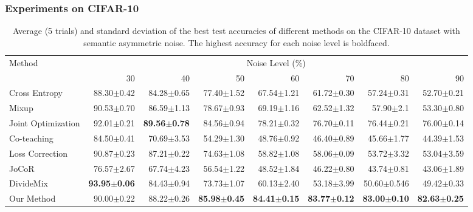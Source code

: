 \documentclass[conference]{IEEEtran}
\begin{document}
\subsubsection{Experiments on CIFAR-10}
\begin{table*}[!tb]
\caption{Average (5 trials) and standard deviation of the best test accuracies  of different methods on the CIFAR-10 dataset with semantic asymmetric noise. The highest accuracy for each noise level is boldfaced.}
\label{cifar_asyn}
\centering
\begin{tabular}{lrrrrrrr}
\toprule
\multirow{2}{*}{Method} & \multicolumn{7}{c}{Noise Level (\%)} \\ \cmidrule{2-8} 
  & 30  & 40  & 50  & 60  & 70  & 80  & 90  \\ \midrule
Cross Entropy   & 88.30$\pm$0.42 & 84.28$\pm$0.65 & 77.40$\pm$1.52 & 67.54$\pm$1.21 & 61.72$\pm$0.30 & 57.24$\pm$0.31 & 52.70$\pm$0.21   \\ \midrule
Mixup\cite{zhang2017mixup}  & 90.53$\pm$0.70 & 86.59$\pm$1.13 & 78.67$\pm$0.93 & 69.19$\pm$1.16 & 62.52$\pm$1.32 & 57.90$\pm$2.1 & 53.30$\pm$0.80    \\ \midrule
Joint Optimization\cite{tanaka2018joint}  & 92.01$\pm$0.21 & \textbf{89.56$\pm$0.78} & 84.56$\pm$0.94 & 78.21$\pm$0.32 & 76.70$\pm$0.11 & 76.44$\pm$0.21 & 76.00$\pm$0.14  \\ \midrule
Co-teaching\cite{han2018co}  & 84.50$\pm$0.41 &	70.69$\pm$3.53 &	54.29$\pm$1.30 &	48.76$\pm$0.92 &	46.40$\pm$0.89 &	45.66$\pm$1.77 &	44.39$\pm$1.53 \\\midrule
Loss Correction\cite{arazo2019unsupervised}  & 90.87$\pm$0.23 & 87.21$\pm$0.22 & 74.63$\pm$1.08 & 58.82$\pm$1.08 & 58.06$\pm$0.09 & 53.72$\pm$3.32 & 53.04$\pm$3.59    \\ \midrule
JoCoR\cite{wei2020combating}  &76.57$\pm$2.67 &	67.74$\pm$4.23 	& 56.54$\pm$1.22 &	48.52$\pm$1.84 &	46.22$\pm$0.80 & 43.74$\pm$0.81 & 43.06$\pm$1.89 \\ \midrule
DivideMix\cite{li2020dividemix}  & \textbf{93.95$\pm$0.06} & 84.43$\pm$0.94 & 73.73$\pm$1.07 & 60.13$\pm$2.40 & 53.18$\pm$3.99 & 50.60$\pm$0.546 & 49.42$\pm$0.33 \\ \midrule
Our Method &  90.00$\pm$0.22 & 88.22$\pm$0.26 & \textbf{85.98$\pm$0.45} & \textbf{84.41$\pm$0.15} & \textbf{83.77$\pm$0.12} & \textbf{83.00$\pm$0.10} & \textbf{82.63$\pm$0.25} \\ 
 \bottomrule
\end{tabular}
\end{table*}
\end{document}
